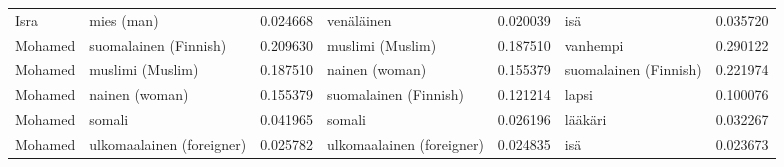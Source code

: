 \begin{longtable}{llrlrlr}
   Isra &                mies (man) &                         0.024668 &                venäläinen &                              0.020039 &                       isä &                        0.035720 \\
Mohamed &     suomalainen (Finnish) &                         0.209630 &          muslimi (Muslim) &                              0.187510 &                  vanhempi &                        0.290122 \\
Mohamed &          muslimi (Muslim) &                         0.187510 &            nainen (woman) &                              0.155379 &     suomalainen (Finnish) &                        0.221974 \\
Mohamed &            nainen (woman) &                         0.155379 &     suomalainen (Finnish) &                              0.121214 &                     lapsi &                        0.100076 \\
Mohamed &                    somali &                         0.041965 &                    somali &                              0.026196 &                   lääkäri &                        0.032267 \\
Mohamed & ulkomaalainen (foreigner) &                         0.025782 & ulkomaalainen (foreigner) &                              0.024835 &                       isä &                        0.023673 \\
\end{longtable}
